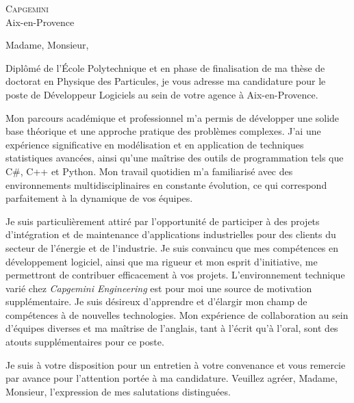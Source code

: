 \documentclass[11pt,a4paper]{lettre}
\begin{document}
\begin{letter} 
{\textsc{Capgemini} \\
Aix-en-Provence} %
\\
\address{M. \textsc{Benane} Gaya\\
171 Avenue de Luminy\\
Logement EF38\\
13~009~\textsc{Marseille}}  

\signature{ Gaya \textsc{Benane}}
\nofax
\date{\today}

{}
\opening{\hspace{1em} Madame, Monsieur,}
\hspace{1em}
Diplômé de l'École Polytechnique et en phase de finalisation de ma thèse de doctorat en Physique des Particules, je vous adresse ma candidature pour le poste de Développeur Logiciels au sein de votre agence à Aix-en-Provence.

\hspace{1em}
Mon parcours académique et professionnel m'a permis de développer une solide base théorique et une approche pratique des problèmes complexes. J'ai une expérience significative en modélisation et en application de techniques statistiques avancées, ainsi qu'une maîtrise des outils de programmation tels que C#, C++ et Python. Mon travail quotidien m'a familiarisé avec des environnements multidisciplinaires en constante évolution, ce qui correspond parfaitement à la dynamique de vos équipes.

Je suis particulièrement attiré par l'opportunité de participer à des projets d'intégration et de maintenance d'applications industrielles pour des clients du secteur de l'énergie et de l'industrie. Je suis convaincu que mes compétences en développement logiciel, ainsi que ma rigueur et mon esprit d'initiative, me permettront de contribuer efficacement à vos projets.
L'environnement technique varié chez \textit{Capgemini Engineering} est pour moi une source de motivation supplémentaire. Je suis désireux d'apprendre et d'élargir mon champ de compétences à de nouvelles technologies. Mon expérience de collaboration au sein d'équipes diverses et ma maîtrise de l'anglais, tant à l'écrit qu'à l'oral, sont des atouts supplémentaires pour ce poste.
\hspace{1em}
\closing{\hspace{1em}
Je suis à votre disposition pour un entretien à votre convenance et vous remercie par avance pour l'attention portée à ma candidature.
Veuillez agréer, Madame, Monsieur, l'expression de mes salutations distinguées.
}
\end{letter}
\end{document}
